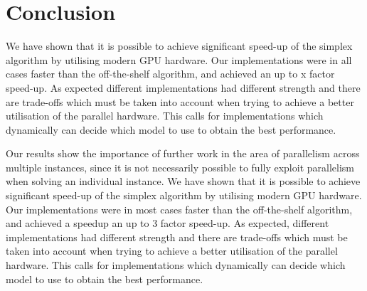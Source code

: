 \section{Conclusion}
We have shown that it is possible to achieve significant speed-up of the simplex algorithm by utilising modern GPU hardware. Our implementations were in all cases faster than the off-the-shelf algorithm, and achieved an up to x factor speed-up. As expected different implementations had different strength and there are trade-offs which must be taken into account when trying to achieve a better utilisation of the parallel hardware. This calls for implementations which dynamically can decide which model to use to obtain the best performance.

Our results show the importance of further work in the area of parallelism across multiple instances, since it is not necessarily possible to fully exploit parallelism when solving an individual instance.
We have shown that it is possible to achieve significant speed-up of the simplex algorithm by utilising modern GPU hardware. Our implementations were in most cases faster than the off-the-shelf algorithm, and achieved a speedup an up to 3 factor speed-up. As expected, different implementations had different strength and there are trade-offs which must be taken into account when trying to achieve a better utilisation of the parallel hardware. This calls for implementations which dynamically can decide which model to use to obtain the best performance.
